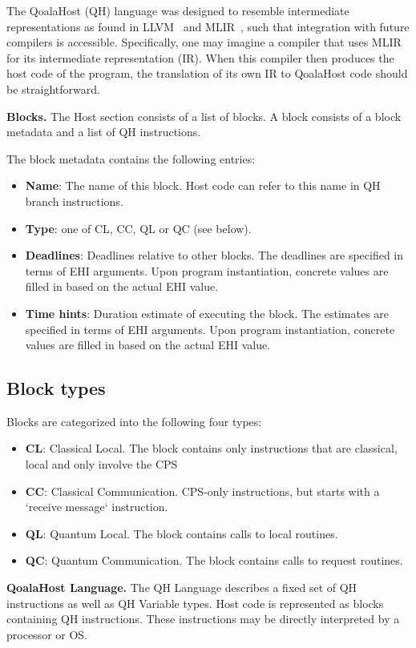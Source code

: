The QoalaHost (QH) language was designed to resemble intermediate representations as found in LLVM~\cite{lattner2004llvm} and MLIR~\cite{lattner2021mlir},
such that integration with future compilers is accessible.
Specifically, one may imagine a compiler that uses MLIR for its intermediate representation (IR).
When this compiler then produces the host code of the program, the translation of its own IR to QoalaHost code should be straightforward.

\textbf{Blocks.} 
The Host section consists of a list of blocks.
A block consists of a block metadata and a list of QH instructions.

The block metadata contains the following entries:
\begin{itemize}
\item \textbf{Name}: The name of this block. Host code can refer to this name in QH branch instructions.
\item \textbf{Type}: one of CL, CC, QL or QC (see below).
\item \textbf{Deadlines}: Deadlines relative to other blocks.
The deadlines are specified in terms of EHI arguments. Upon program instantiation, concrete values are filled in based on the actual EHI value.
\item \textbf{Time hints}: Duration estimate of executing the block.
The estimates are specified in terms of EHI arguments. Upon program instantiation, concrete values are filled in based on the actual EHI value.
\end{itemize}


\subsection{Block types}
Blocks are categorized into the following four types:
\begin{itemize}
\item \textbf{CL}: Classical Local. The block contains only instructions that are classical, local and only involve the CPS
\item \textbf{CC}: Classical Communication. CPS-only instructions, but starts with a `receive message` instruction.
\item \textbf{QL}: Quantum Local. The block contains calls to local routines.
\item \textbf{QC}: Quantum Communication. The block contains calls to request routines.
\end{itemize}


\textbf{QoalaHost Language.}
The QH Language describes a fixed set of QH instructions as well as QH Variable types.
Host code is represented as blocks containing QH instructions.
These instructions may be directly interpreted by a processor or OS.


